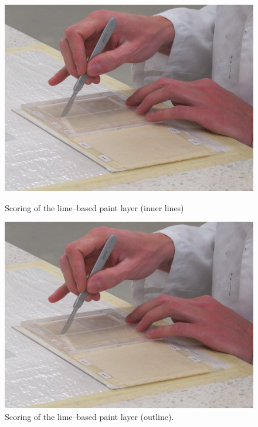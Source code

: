 \documentclass[review]{elsarticle}
\begin{document}
\begin{figure}[htb]
  \centering
  \begin{minipage}[t]{0.48\textwidth}
    \includegraphics[width=\textwidth]{scoring_01}
    \caption{Scoring of the lime--based paint layer (inner lines)}
    \label{fig:scoring_01}
  \end{minipage}
  \hfill
  \begin{minipage}[t]{0.48\textwidth}
    \includegraphics[width=\textwidth]{scoring_01}
    \caption{Scoring of the lime--based paint layer (outline).}
    \label{fig:scoring_02}
  \end{minipage}
\end{figure}
\end{document}
